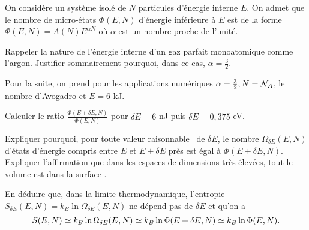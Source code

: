 On considère un système isolé de $N$ particules d'énergie interne $E$. On admet que le nombre de micro-états $\Phi(E,N)$  d'énergie inférieure à $E$ est de la forme $\Phi(E,N)=A(N)E^{\alpha N}$ où $\alpha$ est un nombre proche de l'unité.

\question
Rappeler la nature de l'énergie interne d'un gaz parfait monoatomique comme l'argon. Justifier sommairement pourquoi, dans ce cas, $\alpha=\frac{3}{2}$.

Pour la suite, on prend pour les applications numériques $\alpha=\frac{3}{2}, N={\cal N}_A$, le nombre d'Avogadro et $E= 6$ kJ.

\question
Calculer le ratio $\frac{\Phi(E+\delta E,N)}{\Phi(E,N)}$ pour $\delta E= 6 $ nJ puis  $\delta E= 0,375 $ eV.

\question
Expliquer pourquoi, pour toute valeur \og raisonnable \fg \ de $\delta E$, le nombre $\Omega_{\delta E}(E,N)$ d'états d'énergie compris entre $E$ et $E+\delta E$ près est égal à $\Phi(E+\delta E,N)$. Expliquer l'affirmation que \og dans les espaces de dimensions très élevées, tout le volume est dans la surface \fg.

\question
En déduire que, dans la limite thermodynamique, l'entropie $S_{\delta E}(E,N)=k_B \ln \Omega_{\delta E}(E,N)$ ne dépend pas de ${\delta E}$ et qu'on a
$$
S(E,N) \simeq k_B \ln \Omega_{\delta E}(E,N)\simeq k_B \ln \Phi(E+\delta E,N) \simeq k_B \ln \Phi(E,N). \nonumber \\
$$
